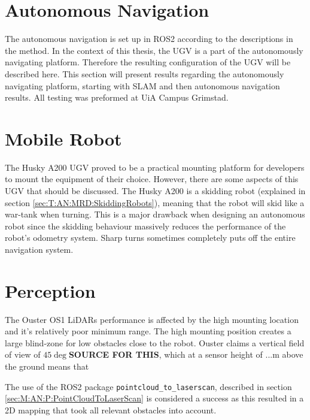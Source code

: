 \section{Autonomous Navigation} \label{sec:R&D:AutonomousNavigaion}
The autonomous navigation is set up in ROS2 according to the descriptions in the method. In the context of this thesis, the UGV is a part of the autonomously navigating platform. Therefore the resulting configuration of the UGV will be described here. This section will present results regarding the autonomously navigating platform, starting with SLAM and then autonomous navigation results. All testing was preformed at UiA Campus Grimstad.

\section{Mobile Robot}\label{sec:R&D:Mobile Robot}
The Husky A200 UGV proved to be a practical mounting platform for developers to mount the equipment of their choice. However, there are some aspects of this UGV that should be discussed. The Husky A200 is a skidding robot (explained in section \ref{sec:T:AN:MRD:SkiddingRobots}), meaning that the robot will skid like a war-tank when turning. This is a major drawback when designing an autonomous robot since the skidding behaviour massively reduces the performance of the robot's odometry system. Sharp turns sometimes completely puts off the entire navigation system. 


\section{Perception}
The Ouster OS1 LiDARs performance is affected by the high mounting location and it's relatively poor minimum range. The high mounting position creates a large blind-zone for low obstacles close to the robot. Ouster claims a vertical field of view of $45\deg$\textbf{SOURCE FOR THIS}, which at a sensor height of ...m above the ground means that 

The use of the ROS2 package \lstinline{pointcloud_to_laserscan}, described in section \ref{sec:M:AN:P:PointCloudToLaserScan} is considered a success as this resulted in a 2D mapping that took all relevant obstacles into account.

